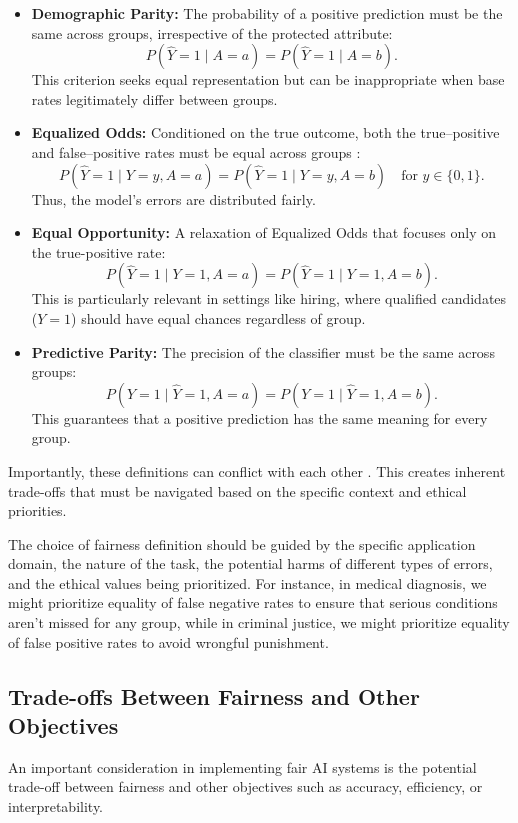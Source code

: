 \documentclass[12pt,a4paper,openright,twoside]{book}
\begin{document}
\begin{itemize}
  \item \textbf{Demographic Parity:}  
  The probability of a positive prediction must be the same across groups, irrespective of the protected attribute:
  \[
    P(\hat{Y}=1 \mid A=a) = P(\hat{Y}=1 \mid A=b).
  \]
  This criterion seeks equal representation but can be inappropriate when base rates legitimately differ between groups.

  \item \textbf{Equalized Odds:}  
  Conditioned on the true outcome, both the true–positive and false–positive rates must be equal across groups \cite{hardt2016equalityopportunitysupervisedlearning}:
  \[
    P(\hat{Y}=1 \mid Y=y, A=a) = P(\hat{Y}=1 \mid Y=y, A=b)
    \quad\text{for } y\in\{0,1\}.
  \]
  Thus, the model’s errors are distributed fairly.

  \item \textbf{Equal Opportunity:}  
  A relaxation of Equalized Odds that focuses only on the true-positive rate:
  \[
    P(\hat{Y}=1 \mid Y=1, A=a) = P(\hat{Y}=1 \mid Y=1, A=b).
  \]
  This is particularly relevant in settings like hiring, where qualified candidates ($Y=1$) should have equal chances regardless of group.

  \item \textbf{Predictive Parity:}  
  The precision of the classifier must be the same across groups:
  \[
    P(Y=1 \mid \hat{Y}=1, A=a) = P(Y=1 \mid \hat{Y}=1, A=b).
  \]
  This guarantees that a positive prediction has the same meaning for every group.
\end{itemize}

Importantly, these definitions can conflict with each other \cite{kusner2017counterfactual}. This creates inherent trade-offs that must be navigated based on the specific context and ethical priorities.

The choice of fairness definition should be guided by the specific application domain, the nature of the task, the potential harms of different types of errors, and the ethical values being prioritized. For instance, in medical diagnosis, we might prioritize equality of false negative rates to ensure that serious conditions aren't missed for any group, while in criminal justice, we might prioritize equality of false positive rates to avoid wrongful punishment.

\subsection{Trade-offs Between Fairness and Other Objectives}
An important consideration in implementing fair AI systems is the potential trade-off between fairness and other objectives such as accuracy, efficiency, or interpretability.
\end{document}

